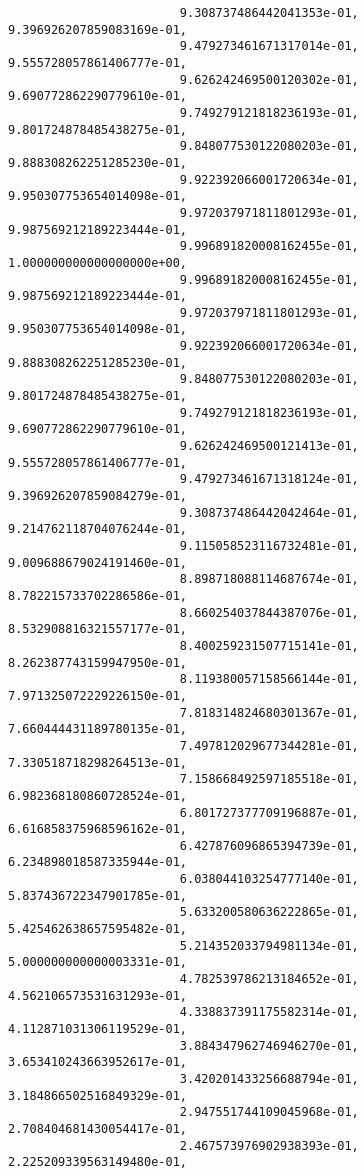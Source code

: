 \documentclass[10pt,letterpaper]{article}
\begin{document}
\begin{lstlisting}
                        9.308737486442041353e-01, 9.396926207859083169e-01,
                        9.479273461671317014e-01, 9.555728057861406777e-01,
                        9.626242469500120302e-01, 9.690772862290779610e-01,
                        9.749279121818236193e-01, 9.801724878485438275e-01,
                        9.848077530122080203e-01, 9.888308262251285230e-01,
                        9.922392066001720634e-01, 9.950307753654014098e-01,
                        9.972037971811801293e-01, 9.987569212189223444e-01,
                        9.996891820008162455e-01, 1.000000000000000000e+00,
                        9.996891820008162455e-01, 9.987569212189223444e-01,
                        9.972037971811801293e-01, 9.950307753654014098e-01,
                        9.922392066001720634e-01, 9.888308262251285230e-01,
                        9.848077530122080203e-01, 9.801724878485438275e-01,
                        9.749279121818236193e-01, 9.690772862290779610e-01,
                        9.626242469500121413e-01, 9.555728057861406777e-01,
                        9.479273461671318124e-01, 9.396926207859084279e-01,
                        9.308737486442042464e-01, 9.214762118704076244e-01,
                        9.115058523116732481e-01, 9.009688679024191460e-01,
                        8.898718088114687674e-01, 8.782215733702286586e-01,
                        8.660254037844387076e-01, 8.532908816321557177e-01,
                        8.400259231507715141e-01, 8.262387743159947950e-01,
                        8.119380057158566144e-01, 7.971325072229226150e-01,
                        7.818314824680301367e-01, 7.660444431189780135e-01,
                        7.497812029677344281e-01, 7.330518718298264513e-01,
                        7.158668492597185518e-01, 6.982368180860728524e-01,
                        6.801727377709196887e-01, 6.616858375968596162e-01,
                        6.427876096865394739e-01, 6.234898018587335944e-01,
                        6.038044103254777140e-01, 5.837436722347901785e-01,
                        5.633200580636222865e-01, 5.425462638657595482e-01,
                        5.214352033794981134e-01, 5.000000000000003331e-01,
                        4.782539786213184652e-01, 4.562106573531631293e-01,
                        4.338837391175582314e-01, 4.112871031306119529e-01,
                        3.884347962746946270e-01, 3.653410243663952617e-01,
                        3.420201433256688794e-01, 3.184866502516849329e-01,
                        2.947551744109045968e-01, 2.708404681430054417e-01,
                        2.467573976902938393e-01, 2.225209339563149480e-01,

\end{lstlisting}
\end{document}
